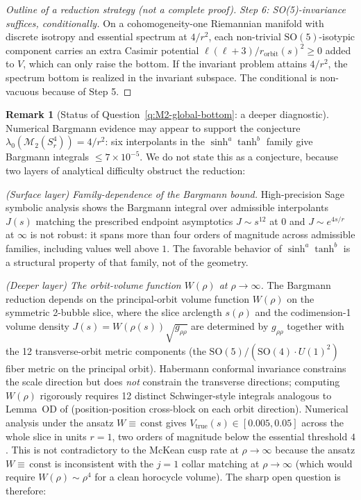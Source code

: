 \documentclass[11pt,letterpaper]{article}
\theoremstyle{definition}
\newtheorem{remark}[theorem]{Remark}
\newcommand{\cM}{\mathcal{M}}
\begin{document}
\begin{proof}[Outline of a reduction strategy (not a complete proof)]
\emph{Step 6: SO(5)-invariance suffices, conditionally.} On a cohomogeneity-one Riemannian manifold with discrete isotropy and essential spectrum at $4/r^2$, each non-trivial $\mathrm{SO}(5)$-isotypic component carries an extra Casimir potential $\ell(\ell+3)/r_{\mathrm{orbit}}(s)^2 \ge 0$ added to $V$, which can only raise the bottom. If the invariant problem attains $4/r^2$, the spectrum bottom is realized in the invariant subspace. The conditional is non-vacuous because of Step 5.
\end{proof}

\begin{remark}[Status of Question~\ref{q:M2-global-bottom}: a deeper diagnostic]\label{rmk:M2-honest-status}
Numerical Bargmann evidence may appear to support the conjecture $\lambda_0(\cM_2(S^4_r)) = 4/r^2$: six interpolants in the $\sinh^a\tanh^b$ family give Bargmann integrals $\le 7\times 10^{-5}$. We do not state this as a conjecture, because two layers of analytical difficulty obstruct the reduction:

\smallskip
\noindent\emph{(Surface layer) Family-dependence of the Bargmann bound.} High-precision Sage symbolic analysis \cite{m2-bargmann-true-V} shows the Bargmann integral over admissible interpolants $J(s)$ matching the prescribed endpoint asymptotics $J \sim s^{12}$ at $0$ and $J \sim e^{4s/r}$ at $\infty$ is not robust: it spans more than four orders of magnitude across admissible families, including values well above $1$. The favorable behavior of $\sinh^a\tanh^b$ is a structural property of that family, not of the geometry.

\smallskip
\noindent\emph{(Deeper layer) The orbit-volume function $W(\rho)$ at $\rho \to \infty$.} The Bargmann reduction depends on the principal-orbit volume function $W(\rho)$ on the symmetric 2-bubble slice, where the slice arclength $s(\rho)$ and the codimension-1 volume density $J(s) = W(\rho(s))\sqrt{g_{\rho\rho}}$ are determined by $g_{\rho\rho}$ together with the 12 transverse-orbit metric components (the $\mathrm{SO}(5)/(\mathrm{SO}(4)\cdot U(1)^2)$ fiber metric on the principal orbit). Habermann conformal invariance constrains the scale direction but does \emph{not} constrain the transverse directions; computing $W(\rho)$ rigorously requires 12 distinct Schwinger-style integrals analogous to Lemma~OD of \cite{bonfioli-core} (position-position cross-block on each orbit direction). Numerical analysis \cite{m2-closure-higher-order} under the ansatz $W \equiv\,\mathrm{const}$ gives $V_{\mathrm{true}}(s) \in [0.005, 0.05]$ across the whole slice in units $r=1$, two orders of magnitude below the essential threshold $4$. This is not contradictory to the McKean cusp rate at $\rho \to \infty$ because the ansatz $W \equiv\,\mathrm{const}$ is inconsistent with the $j=1$ collar matching at $\rho \to \infty$ (which would require $W(\rho) \sim \rho^4$ for a clean horocycle volume). The sharp open question is therefore:


\end{remark}
\end{document}
